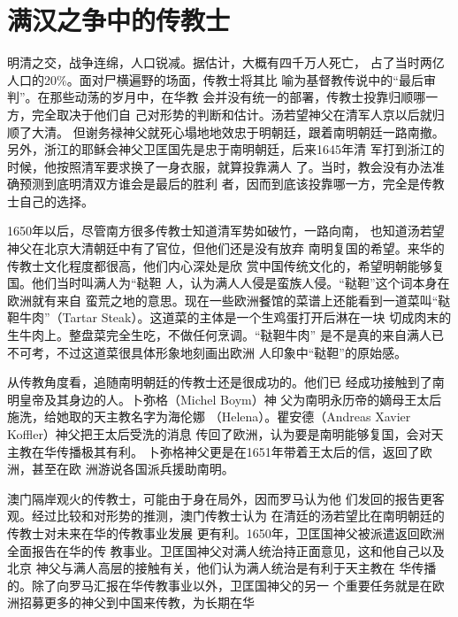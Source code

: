 \section{满汉之争中的传教士}
\par
明清之交，战争连绵，人口锐减。据估计，大概有四千万人死亡，%
占了当时两亿人口的20\%。面对尸横遍野的场面，传教士将其比%
喻为基督教传说中的“最后审判”。在那些动荡的岁月中，在华教%
会并没有统一的部署，传教士投靠归顺哪一方，完全取决于他们自%
己对形势的判断和估计。汤若望神父在清军人京以后就归顺了大清。%
但谢务禄神父就死心塌地地效忠于明朝廷，跟着南明朝廷一路南撤。%
另外，浙江的耶稣会神父卫匡国先是忠于南明朝廷，后来1645年清%
军打到浙江的时候，他按照清军要求换了一身衣服，就算投靠满人%
了。当时，教会没有办法准确预测到底明清双方谁会是最后的胜利%
者，因而到底该投靠哪一方，完全是传教士自己的选择。%
\par
1650年以后，尽管南方很多传教士知道清军势如破竹，一路向南，%
也知道汤若望神父在北京大清朝廷中有了官位，但他们还是没有放弃%
南明复国的希望。来华的传教士文化程度都很高，他们内心深处是欣%
赏中国传统文化的，希望明朝能够复国。他们当时叫满人为“鞑靼%
人，认为满人人侵是蛮族人侵。“鞑靼”这个词本身在欧洲就有来自%
蛮荒之地的意思。现在一些欧洲餐馆的菜谱上还能看到一道菜叫“鞑%
靼牛肉”（Tartar Steak）。这道菜的主体是一个生鸡蛋打开后淋在一块%
切成肉末的生牛肉上。整盘菜完全生吃，不做任何烹调。“鞑靼牛肉”%
是不是真的来自满人已不可考，不过这道菜很具体形象地刻画出欧洲%
人印象中“鞑靼”的原始感。%
\par
从传教角度看，追随南明朝廷的传教士还是很成功的。他们已%
经成功接触到了南明皇帝及其身边的人。卜弥格（Michel Boym）神%
父为南明永历帝的嫡母王太后施洗，给她取的天主教名字为海伦娜%
（Helena）。瞿安德（Andreas Xavier Koffler）神父把王太后受洗的消息%
传回了欧洲，认为要是南明能够复国，会对天主教在华传播极其有利。%
卜弥格神父更是在1651年带着王太后的信，返回了欧洲，甚至在欧%
洲游说各国派兵援助南明。%
\par
澳门隔岸观火的传教士，可能由于身在局外，因而罗马认为他%
们发回的报告更客观。经过比较和对形势的推测，澳门传教士认为%
在清廷的汤若望比在南明朝廷的传教士对未来在华的传教事业发展%
更有利。1650年，卫匡国神父被派遣返回欧洲全面报告在华的传%
教事业。卫匡国神父对满人统治持正面意见，这和他自己以及北京%
神父与满人高层的接触有关，他们认为满人统治是有利于天主教在%
华传播的。除了向罗马汇报在华传教事业以外，卫匡国神父的另一%
个重要任务就是在欧洲招募更多的神父到中国来传教，为长期在华%
